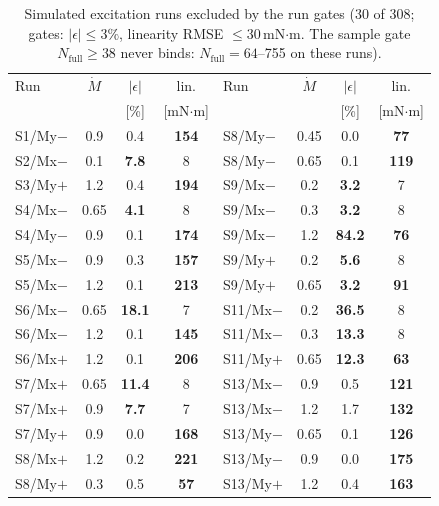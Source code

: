 \begin{table}[t]
\caption{Simulated excitation runs excluded by the run
gates (30 of 308; gates: $|\epsilon| \le 3\%$, linearity RMSE $\le 30$\,mN$\cdot$m. The sample gate $N_{\mathrm{full}} \ge 38$ never binds: $N_{\mathrm{full}} = 64$--755 on these runs).}
\label{tab:sim_gate_exclusions}
\centering\small
\begin{tabular}{@{}lccc@{\qquad}lccc@{}}
\toprule
Run & $\dot M$ & $|\epsilon|$ & lin. & Run & $\dot M$ & $|\epsilon|$ & lin.\\
 & & [\%] & [mN$\cdot$m] & & & [\%] & [mN$\cdot$m]\\
\midrule
S1/My$-$ & 0.9 & 0.4 & \textbf{154} & S8/My$-$ & 0.45 & 0.0 & \textbf{77}\\
S2/Mx$-$ & 0.1 & \textbf{7.8} & 8 & S8/My$-$ & 0.65 & 0.1 & \textbf{119}\\
S3/My$+$ & 1.2 & 0.4 & \textbf{194} & S9/Mx$-$ & 0.2 & \textbf{3.2} & 7\\
S4/Mx$-$ & 0.65 & \textbf{4.1} & 8 & S9/Mx$-$ & 0.3 & \textbf{3.2} & 8\\
S4/My$-$ & 0.9 & 0.1 & \textbf{174} & S9/Mx$-$ & 1.2 & \textbf{84.2} & \textbf{76}\\
S5/Mx$-$ & 0.9 & 0.3 & \textbf{157} & S9/My$+$ & 0.2 & \textbf{5.6} & 8\\
S5/Mx$-$ & 1.2 & 0.1 & \textbf{213} & S9/My$+$ & 0.65 & \textbf{3.2} & \textbf{91}\\
S6/Mx$-$ & 0.65 & \textbf{18.1} & 7 & S11/Mx$-$ & 0.2 & \textbf{36.5} & 8\\
S6/Mx$-$ & 1.2 & 0.1 & \textbf{145} & S11/Mx$-$ & 0.3 & \textbf{13.3} & 8\\
S6/Mx$+$ & 1.2 & 0.1 & \textbf{206} & S11/My$+$ & 0.65 & \textbf{12.3} & \textbf{63}\\
S7/Mx$+$ & 0.65 & \textbf{11.4} & 8 & S13/Mx$-$ & 0.9 & 0.5 & \textbf{121}\\
S7/Mx$+$ & 0.9 & \textbf{7.7} & 7 & S13/Mx$-$ & 1.2 & 1.7 & \textbf{132}\\
S7/My$+$ & 0.9 & 0.0 & \textbf{168} & S13/My$-$ & 0.65 & 0.1 & \textbf{126}\\
S8/Mx$+$ & 1.2 & 0.2 & \textbf{221} & S13/My$-$ & 0.9 & 0.0 & \textbf{175}\\
S8/My$+$ & 0.3 & 0.5 & \textbf{57} & S13/My$+$ & 1.2 & 0.4 & \textbf{163}\\
\bottomrule
\end{tabular}
\end{table}
